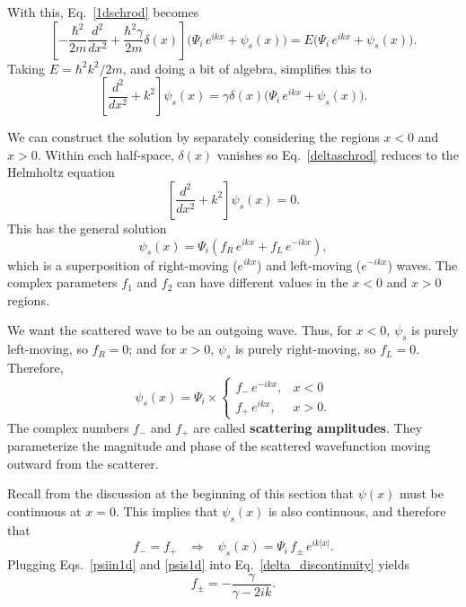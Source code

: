 \documentclass[prx,12pt]{revtex4-2}
\begin{document}
With this, Eq.~\eqref{1dschrod} becomes
\begin{equation}
  \left[-\frac{\hbar^2}{2m} \frac{d^2}{dx^2} + \frac{\hbar^2\gamma}{2m}\delta(x)\right] \Big(\Psi_i \, e^{ikx} + \psi_s(x) \Big)
  = E \Big(\Psi_i \, e^{ikx} + \psi_s(x) \Big).
\end{equation}
Taking $E = \hbar^2k^2/2m$, and doing a bit of algebra, simplifies this to
\begin{equation}
  \left[ \frac{d^2}{dx^2} + k^2\right] \psi_s(x)
  = \gamma \delta(x) \Big(\Psi_i \, e^{ikx} + \psi_s(x) \Big).
  \label{deltaschrod}
\end{equation}

We can construct the solution by separately considering the regions $x
< 0$ and $x > 0$.  Within each half-space, $\delta(x)$ vanishes so
Eq.~\eqref{deltaschrod} reduces to the Helmholtz equation
\begin{equation}
  \left[\frac{d^2}{dx^2} + k^2\right] \psi_s(x) = 0.
\end{equation}
This has the general solution
\begin{equation}
  \psi_s(x) = \Psi_i \left(f_R \, e^{ik x} + f_L \, e^{-ik x}\right),
\end{equation}
which is a superposition of right-moving ($e^{ikx}$) and left-moving
($e^{-ikx}$) waves.  The complex parameters $f_1$ and $f_2$ can
have different values in the $x < 0$ and $x > 0$ regions.

We want the scattered wave to be an outgoing wave.  Thus, for $x < 0$,
$\psi_s$ is purely left-moving, so $f_R = 0$; and for $x > 0$,
$\psi_s$ is purely right-moving, so $f_L = 0$.  Therefore,
\begin{equation}
  \psi_s(x) = \Psi_i \times \begin{cases}f_- \,e^{-ikx}, & x < 0 \\ f_+ \,e^{ikx}, & x > 0.\end{cases}
\end{equation}
The complex numbers $f_-$ and $f_+$ are called \textbf{scattering
  amplitudes}.  They parameterize the magnitude and phase of the
scattered wavefunction moving outward from the scatterer.

Recall from the discussion at the beginning of this section that
$\psi(x)$ must be continuous at $x = 0$.  This implies that
$\psi_s(x)$ is also continuous, and therefore that
\begin{equation}
  f_- = f_+ \;\;\;\Rightarrow \;\;\;
  \psi_s(x) = \Psi_i \,f_\pm\, e^{ik|x|}.
  \label{psis1d}
\end{equation}
Plugging Eqs.~\eqref{psiin1d} and \eqref{psis1d} into
Eq.~\eqref{delta_discontinuity} yields
\begin{equation}
  f_\pm = -\frac{\gamma}{\gamma - 2ik}.
\end{equation}
\end{document}
